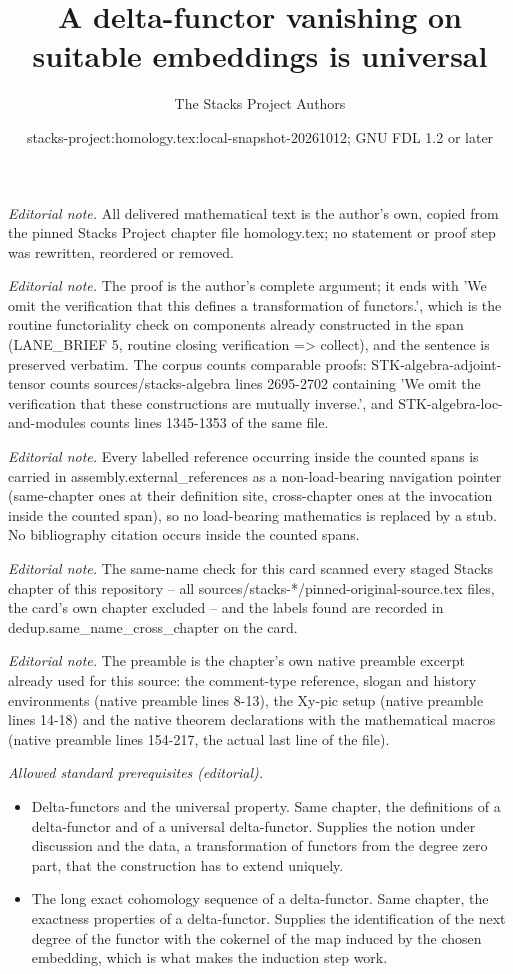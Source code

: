 \documentclass[10pt,a4paper]{amsart}
\title{A delta-functor vanishing on suitable embeddings is universal}
\author{The Stacks Project Authors}
\date{stacks-project:homology.tex:local-snapshot-20261012; GNU FDL 1.2 or later}
\theoremstyle{plain}
\theoremstyle{definition}
\theoremstyle{remark}
\numberwithin{equation}{subsection}
\begin{document}
\maketitle
\noindent\textit{Editorial note.} All delivered mathematical text is the author's own, copied from the pinned Stacks Project chapter file homology.tex; no statement or proof step was rewritten, reordered or removed.\par\medskip
\noindent\textit{Editorial note.} The proof is the author's complete argument; it ends with 'We omit the verification that this defines a transformation of functors.', which is the routine functoriality check on components already constructed in the span (LANE\_BRIEF 5, routine closing verification => collect), and the sentence is preserved verbatim. The corpus counts comparable proofs: STK-algebra-adjoint-tensor counts sources/stacks-algebra lines 2695-2702 containing 'We omit the verification that these constructions are mutually inverse.', and STK-algebra-loc-and-modules counts lines 1345-1353 of the same file.\par\medskip
\noindent\textit{Editorial note.} Every labelled reference occurring inside the counted spans is carried in assembly.external\_references as a non-load-bearing navigation pointer (same-chapter ones at their definition site, cross-chapter ones at the invocation inside the counted span), so no load-bearing mathematics is replaced by a stub. No bibliography citation occurs inside the counted spans.\par\medskip
\noindent\textit{Editorial note.} The same-name check for this card scanned every staged Stacks chapter of this repository -- all sources/stacks-*/pinned-original-source.tex files, the card's own chapter excluded -- and the labels found are recorded in dedup.same\_name\_cross\_chapter on the card.\par\medskip
\noindent\textit{Editorial note.} The preamble is the chapter's own native preamble excerpt already used for this source: the comment-type reference, slogan and history environments (native preamble lines 8-13), the Xy-pic setup (native preamble lines 14-18) and the native theorem declarations with the mathematical macros (native preamble lines 154-217, the actual last line of the file).\par\medskip
\noindent\textit{Allowed standard prerequisites (editorial).}\begin{itemize}
\item Delta-functors and the universal property. Same chapter, the definitions of a delta-functor and of a universal delta-functor. Supplies the notion under discussion and the data, a transformation of functors from the degree zero part, that the construction has to extend uniquely.
\item The long exact cohomology sequence of a delta-functor. Same chapter, the exactness properties of a delta-functor. Supplies the identification of the next degree of the functor with the cokernel of the map induced by the chosen embedding, which is what makes the induction step work.
\end{itemize}\medskip
\end{document}
